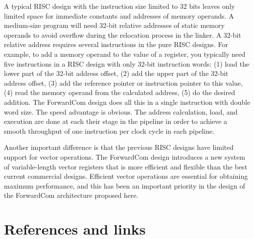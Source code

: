 \documentclass[forwardcom.tex]{subfiles}
\begin{document}
A typical RISC design with the instruction size limited to 32 bits leaves only limited space for immediate constants and addresses of memory operands. A medium-size program will need 32-bit relative addresses of static memory operands to avoid overflow during the relocation process in the linker. A 32-bit relative address requires several instructions in the pure RISC designs. For example, to add a memory operand to the value of a register, you typically need five instructions in a RISC design with only 32-bit instruction words: (1) load the lower part of the 32-bit address offset, (2) add the upper part of the 32-bit address offset, (3) add the reference pointer or instruction pointer to this value, (4) read the memory operand from the calculated address, (5) do the desired addition. The ForwardCom design does all this in a single instruction with double word size. The speed advantage is obvious. The address calculation, load, and execution are done at each their stage in the pipeline in order to achieve a smooth throughput of one instruction per clock cycle in each pipeline.
\vv

Another important difference is that the previous RISC designs have limited support for vector operations. The ForwardCom design introduces a new system of variable-length vector registers that is more efficient and flexible than the best current commercial designs. Efficient vector operations are essential for obtaining maximum performance, and this has been an important priority in the design of the ForwardCom architecture proposed here.

\section{References and links} \label{referencesToIntroduction}
\end{document}
